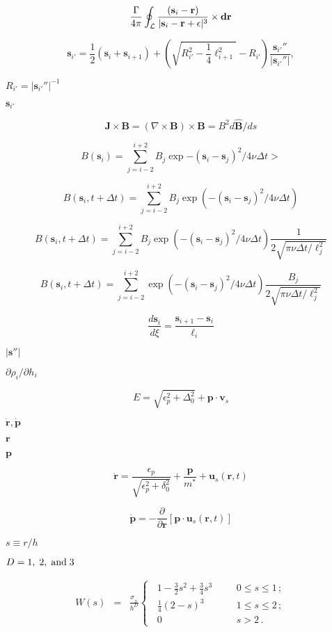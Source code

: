 \documentclass{article}
\begin{document}
\[\frac{\Gamma}{4 \pi} \oint_{\cal L} \frac{(\mathbf{s}_i-\mathbf{r}) } {\vert \mathbf{s}_i - \mathbf{r} + \epsilon \vert^3} \times {\bf d}\mathbf{r} \]
\pagebreak

\[ \mathbf{s}_{i'}=\frac{1}{2}(\mathbf{s}_i+\mathbf{s}_{i+1})+\left( \sqrt{R^2_{i'} -\frac{1}{4}\ell_{i+1}^2}-R_{i'} \right)\frac{\mathbf{s}_{i'}''}{|\mathbf{s}_{i'}''|},\]
\pagebreak

$R_{i'}=|\mathbf{s}_{i'}''|^{-1}$
\pagebreak

$ \mathbf{s}_{i'} $
\pagebreak

\[\mathbf{J} \times \mathbf{B}=(\nabla \times \mathbf{B}) \times \mathbf{B} =B^2 d\hat{\mathbf{B}}/ds\]
\pagebreak

\[B(\mathbf{s}_i)=\sum_{j=i-2}^{i+2}B_j\exp{-(\mathbf{s}_i-\mathbf{s}_j)^2/ 4\nu \Delta t}>\]
\pagebreak

\[B(\mathbf{s}_i,t+\Delta t)=\sum_{j=i-2}^{i+2}B_j\exp(-(\mathbf{s}_i -\mathbf{s}_j)^2/4\nu \Delta t)\]
\pagebreak

\[B(\mathbf{s}_i,t+\Delta t)=\sum_{j=i-2}^{i+2}B_j\exp(-(\mathbf{s}_i -\mathbf{s}_j)^2/4\nu \Delta t)\frac{1}{2\sqrt{\pi\nu\Delta t/\ell_j^2}}\]
\pagebreak

\[B(\mathbf{s}_i,t+\Delta t)=\sum_{j=i-2}^{i+2}\exp(-(\mathbf{s}_i -\mathbf{s}_j)^2/4\nu \Delta t)\frac{B_j}{2\sqrt{\pi\nu\Delta t/\ell_j^2}}\]
\pagebreak

\[ \frac{d \mathbf{s}_i}{d \xi}=\frac{\mathbf{s}_{i+1}-\mathbf{s}_{i}}{\ell_i} \]
\pagebreak

$|\mathbf{s}''|$
\pagebreak

$ \partial \rho_i / \partial h_i$
\pagebreak

\[ E=\sqrt{\epsilon^2_p+\Delta^2_0} +\mathbf{p} \cdot \mathbf{v}_s \]
\pagebreak

$ \dot{\mathbf{r}},\dot{\mathbf{p}}$
\pagebreak

$\mathbf{r}$
\pagebreak

$\mathbf{p}$
\pagebreak

\[ \dot{\mathbf{r}}=\frac{\epsilon_p}{\sqrt{\epsilon_p^2+\delta_0^2}} +\frac{\mathbf{p}}{m^*}+\mathbf{u}_s(\mathbf{r},t)\]
\pagebreak

\[ \dot{\mathbf{p}}=-\frac{\partial}{\partial \mathbf{r}} \left [ \mathbf{p} \cdot \mathbf{u}_s(\mathbf{r},t) \right ]\]
\pagebreak

$s\equiv r/h$
\pagebreak

$D=1,\;2,\;{\rm and}\;3\,$
\pagebreak

\begin{eqnarray} W (s) &=& \frac{\sigma_{\!_D}}{h^D} \left\{ \;\; \begin{array}{ll} 1 - \frac{3}{2}s^2 + \frac{3}{4}s^3 \;\;\;\; & \;\;0 \leq s \leq 1\,; \\ \frac{1}{4}(2-s)^3 \;\;\;\; & \;\;1 \leq s \leq 2\,; \\ 0 \;\;\;\; & \;\;s > 2 \,. \end{array} \right . \end{eqnarray}
\pagebreak
\end{document}
